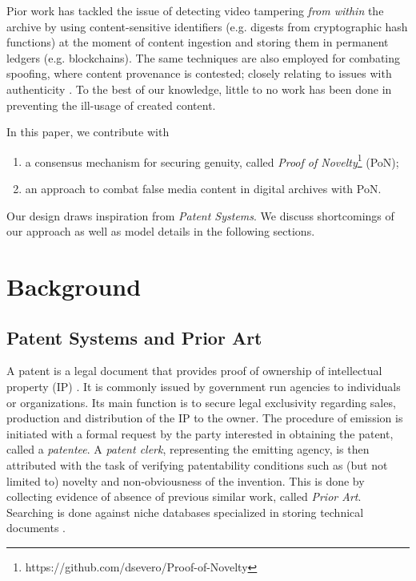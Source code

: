 \documentclass[conference]{IEEEtran}
\begin{document}
Pior work has tackled the issue of detecting video tampering \emph{from within} the archive by using content-sensitive identifiers (e.g. digests from cryptographic hash functions) at the moment of content ingestion and storing them in permanent ledgers (e.g. blockchains). The same techniques are also employed for combating spoofing, where content provenance is contested; closely relating to issues with authenticity \cite{hasan2019combating}. To the best of our knowledge, little to no work has been done in preventing the ill-usage of created content.

In this paper, we contribute with

\begin{enumerate}
    \item a consensus mechanism for securing genuity, called \emph{Proof of Novelty}\footnote{https://github.com/dsevero/Proof-of-Novelty} (PoN);
    \item an approach to combat false media content in digital archives with PoN.
\end{enumerate}

Our design draws inspiration from \emph{Patent Systems}. We discuss shortcomings of our approach as well as model details in the following sections.

\section{Background}
\subsection{Patent Systems and Prior Art}
A patent is a legal document that provides proof of ownership of intellectual property (IP) \cite{callaert2006traces}. It is commonly issued by government run agencies to individuals or organizations. Its main function is to secure legal exclusivity regarding sales, production and distribution of the IP to the owner. The procedure of emission is initiated with a formal request by the party interested in obtaining the patent, called a \emph{patentee}. A \emph{patent clerk}, representing the emitting agency, is then attributed with the task of verifying patentability conditions such as (but not limited to) novelty and non-obviousness of the invention. This is done by collecting evidence of absence of previous similar work, called \emph{Prior Art}. Searching is done against niche databases specialized in storing technical documents \cite{callaert2006traces}.
\end{document}
